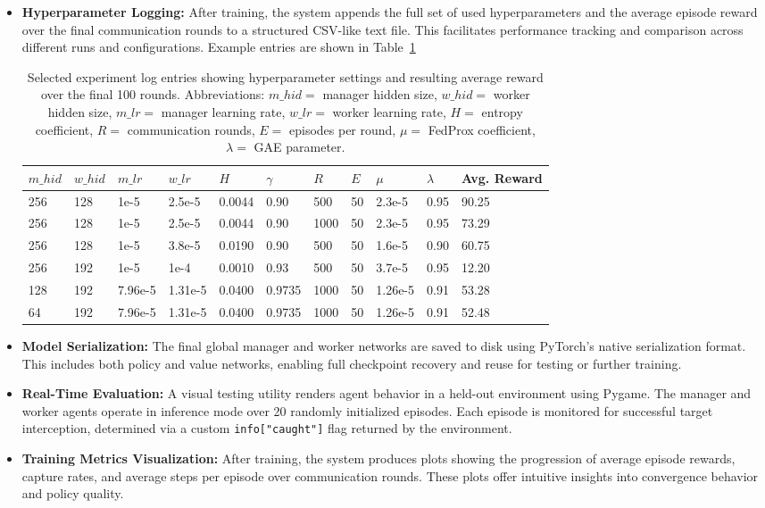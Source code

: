 \documentclass[12pt,a4paper,twoside,openany]{book}
\begin{document}
\begin{itemize}
    \item \textbf{Hyperparameter Logging:} After training, the system appends the full set of used hyperparameters and the average episode reward over the final communication rounds to a structured CSV-like text file. This facilitates performance tracking and comparison across different runs and configurations. Example entries are shown in Table~\ref{tab:experiment_log}

\begin{table}[h]
\centering
\small
\begin{tabular}{lllllllllll}
\toprule
$m\_hid$ & $w\_hid$ & $m\_lr$ & $w\_lr$ & $H$ & $\gamma$ & $R$ & $E$ & $\mu$ & $\lambda$ & Avg. Reward \\
\midrule
256 & 128 & 1e-5 & 2.5e-5 & 0.0044 & 0.90 & 500 & 50 & 2.3e-5 & 0.95 & 90.25 \\
256 & 128 & 1e-5 & 2.5e-5 & 0.0044 & 0.90 & 1000 & 50 & 2.3e-5 & 0.95 & 73.29 \\
256 & 128 & 1e-5 & 3.8e-5 & 0.0190 & 0.90 & 500 & 50 & 1.6e-5 & 0.90 & 60.75 \\
256 & 192 & 1e-5 & 1e-4 & 0.0010 & 0.93 & 500 & 50 & 3.7e-5 & 0.95 & 12.20 \\
128 & 192 & 7.96e-5 & 1.31e-5 & 0.0400 & 0.9735 & 1000 & 50 & 1.26e-5 & 0.91 & 53.28 \\
64 & 192 & 7.96e-5 & 1.31e-5 & 0.0400 & 0.9735 & 1000 & 50 & 1.26e-5 & 0.91 & 52.48 \\
\bottomrule
\end{tabular}
\caption{Selected experiment log entries showing hyperparameter settings and resulting average reward over the final 100 rounds. Abbreviations: $m\_hid=$ manager hidden size, $w\_hid=$ worker hidden size, $m\_lr=$ manager learning rate, $w\_lr=$ worker learning rate, $H=$ entropy coefficient, $R=$ communication rounds, $E=$ episodes per round, $\mu=$ FedProx coefficient, $\lambda=$ GAE parameter.}
\label{tab:experiment_log}
\end{table}
    
    \item \textbf{Model Serialization:} The final global manager and worker networks are saved to disk using PyTorch's native serialization format. This includes both policy and value networks, enabling full checkpoint recovery and reuse for testing or further training.

    \item \textbf{Real-Time Evaluation:} A visual testing utility renders agent behavior in a held-out environment using Pygame. The manager and worker agents operate in inference mode over 20 randomly initialized episodes. Each episode is monitored for successful target interception, determined via a custom \texttt{info["caught"]} flag returned by the environment.

    \item \textbf{Training Metrics Visualization:} After training, the system produces plots showing the progression of average episode rewards, capture rates, and average steps per episode over communication rounds. These plots offer intuitive insights into convergence behavior and policy quality.
\end{itemize}
\end{document}
